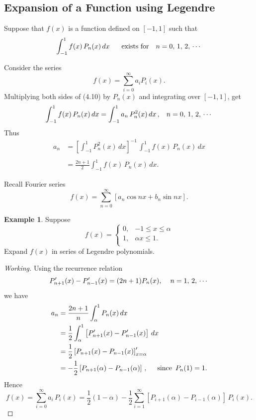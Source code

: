 \documentclass[12pt,a4paper]{report}
\theoremstyle{definition}
\newtheorem{exa}[thm]{Example}
\theoremstyle{plain}
\begin{document}
\subsection{Expansion of a Function using Legendre}
\vspace{-5mm}
Suppose that $f(x)$ is a function defined on $[-1,1]$ such that
$$\int_{-1}^1f(x)\, P_n(x)\, dx\hspace{0.6cm} \text{exists for }\,\, \, \, n = 0,\, 1,\, 2, \, \cdots$$

Consider the series 
\begin{equation}
f(x) = \sum_{i=0}^{\infty} a_iP_i(x).
\end{equation}
Multiplying both sides of (4.10) by $P_n(x)$ and integrating over $[-1,1]$, get
$$\int_{-1}^1f(x)\, P_n(x)\, dx = \int_{-1}^1a_n\, P^2_n(x)\, dx\, , \hspace{0.3cm} n = 0,\, 1,\, 2, \, \cdots$$
Thus 
\begin{align*}
a_n  & = \left[\int_{-1}^1P^2_n(x)\, dx \right]^{-1}\, \int_{-1}^1f(x)\, P_n(x)\, dx\\\\
     & = \frac{2n + 1}{2}\int^1_{-1} f(x) \, P_n(x)\, dx.
\end{align*}


Recall Fourier series 
$$f(x) = \sum_{n=0}^{\infty}\left[a_n\cos nx + b_n \sin nx\right].$$ 
\vspace{0.5cm}



\begin{exa}
Suppose $$f(x) = \begin{cases}
                   0, & -1\leq x \leq \alpha\\
                   1, & \alpha x \leq 1.\\
                 \end{cases}$$
Expand $f(x)$ in series of Legendre polynomials.                 
\end{exa}


\begin{proof}[Working]
Using the recurrence relation
$$P'_{n+1}(x) - P'_{n-1}(x) = (2n + 1)P_n(x), \hspace{0.4cm} n = 1, \, 2, \, \cdots$$
we have
\begin{align*}
a_n & = \frac{2n + 1}{n} \int_{\alpha}^1P_n(x) \, dx\\
    & = \frac{1}{2}\int_{\alpha}^1\left[P'_{n+1}(x) - P_{n-1}'(x)\right]\, dx\\
    & = \frac{1}{2}\left[P_{n+1}(x) - P_{n-1}(x)\right]'_{x=\alpha}\\
    & = -\frac{1}{2}\left[P_{n+1}(\alpha) - P_{n-1}(\alpha)\right]\, , \hspace{0.5cm} \text{since}\,\,\, P_n(1) = 1.
\end{align*}
Hence
$$f(x)  = \sum_{i=0}^{\infty} a_i \, P_i(x) = \frac{1}{2}(1 - \alpha)-\frac{1}{2}\sum_{i=1}^{\infty} \left[P_{i+1}(\alpha) - P_{i-1}(\alpha)\right]\, P_i(x).$$
\end{proof}
\vspace{0.5mm}
\end{document}
